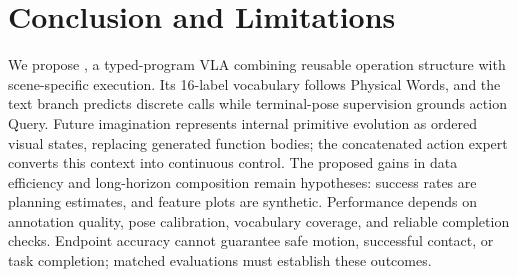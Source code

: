 \section{Conclusion and Limitations}
\label{sec:discussion}
We propose \model{}, a typed-program VLA combining reusable operation structure with scene-specific execution. Its 16-label vocabulary follows Physical Words, and the text branch predicts discrete calls while terminal-pose supervision grounds action Query. Future imagination represents internal primitive evolution as ordered visual states, replacing generated function bodies; the concatenated action expert converts this context into continuous control. The proposed gains in data efficiency and long-horizon composition remain hypotheses: success rates are planning estimates, and feature plots are synthetic. Performance depends on annotation quality, pose calibration, vocabulary coverage, and reliable completion checks. Endpoint accuracy cannot guarantee safe motion, successful contact, or task completion; matched evaluations must establish these outcomes.
